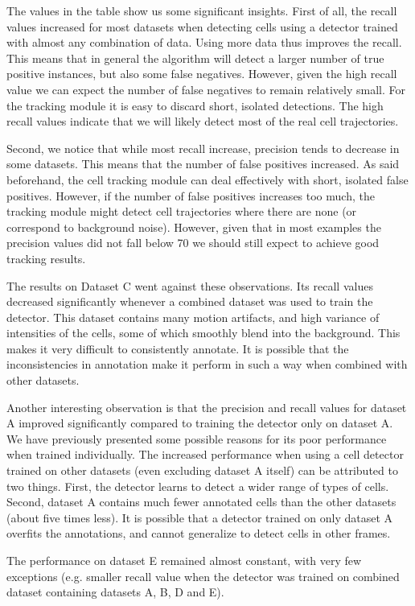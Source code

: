 		The values in the table show us some significant insights. First of all, the recall values increased for most datasets when detecting cells using a detector trained with almost any combination of data. Using more data thus improves the recall. This means that in general the algorithm will detect a larger number of true positive instances, but also some false negatives. However, given the high recall value we can expect the number of false negatives to remain relatively small. For the tracking module it is easy to discard short, isolated detections. The high recall values indicate that we will likely detect most of the real cell trajectories.
		
		Second, we notice that while most recall increase, precision tends to decrease in some datasets. This means that the number of false positives increased. As said beforehand, the cell tracking module can deal effectively with short, isolated false positives. However, if the number of false positives increases too much, the tracking module might detect cell trajectories where there are none (or correspond to background noise). However, given that in most examples the precision values did not fall below 70 we should still expect to achieve good tracking results.
		
		The results on Dataset C went against these observations. Its recall values decreased significantly whenever a combined dataset was used to train the detector. This dataset contains many motion artifacts, and high variance of intensities of the cells, some of which smoothly blend into the background. This makes it very difficult to consistently annotate. It is possible that the inconsistencies in annotation make it perform in such a way when combined with other datasets.
		
		Another interesting observation is that the precision and recall values for dataset A improved significantly compared to training the detector only on dataset A. We have previously presented some possible reasons for its poor performance when trained individually. The increased performance when using a cell detector trained on other datasets (even excluding dataset A itself) can be attributed to two things. First, the detector learns to detect a wider range of types of cells. Second, dataset A contains much fewer annotated cells than the other datasets (about five times less). It is possible that a detector trained on only dataset A overfits the annotations, and cannot generalize to detect cells in other frames. 
		
		The performance on dataset E remained almost constant, with very few exceptions (e.g. smaller recall value when the detector was trained on combined dataset containing datasets A, B, D and E).

